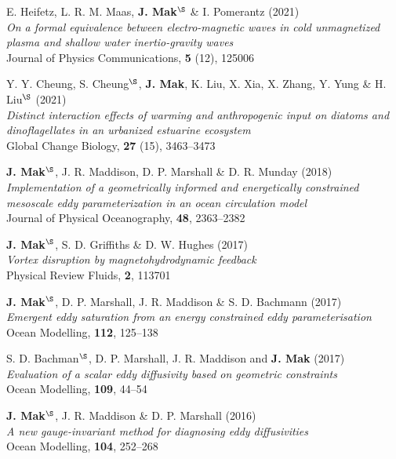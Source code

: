\documentclass[letterpaper]{article}
\renewenvironment{itemize}{
  \begin{list}{}{
    \setlength{\leftmargin}{1.5em}
  }
}{
  \end{list}
}
\begin{document}
\begin{itemize}
\item[11.] E. Heifetz, L. R. M. Maas, \textbf{J. Mak}$^{\S}$ \& I. Pomerantz (2021)\\
\textit{On a formal equivalence between electro-magnetic waves in cold unmagnetized plasma and shallow water inertio-gravity waves}\\
Journal of Physics Communications, \textbf{5} (12), 125006

\item[10.] Y. Y. Cheung, S. Cheung$^{\S}$, \textbf{J. Mak}, K. Liu, X. Xia, X. Zhang, Y. Yung \& H. Liu$^{\S}$ (2021)\\
\textit{Distinct interaction effects of warming and anthropogenic input on
diatoms and dinoflagellates in an urbanized estuarine ecosystem}\\
Global Change Biology, \textbf{27} (15), 3463--3473

\item[9.] \textbf{J. Mak}$^{\S}$, J. R. Maddison, D. P. Marshall \& D. R. Munday
(2018)\\
\textit{Implementation of a geometrically informed and energetically constrained
mesoscale eddy parameterization in an ocean circulation model}\\
Journal of Physical Oceanography, \textbf{48}, 2363--2382

\item[8.] \textbf{J. Mak}$^{\S}$, S. D. Griffiths \& D. W. Hughes
(2017)\\
\textit{Vortex disruption by magnetohydrodynamic feedback}\\
Physical Review Fluids, \textbf{2}, 113701

\item[7.] \textbf{J. Mak}$^{\S}$, D. P. Marshall, J. R. Maddison \& S. D. Bachmann
(2017)\\
\textit{Emergent eddy saturation from an energy constrained eddy parameterisation}\\
Ocean Modelling, \textbf{112}, 125--138

\item[6.] S. D. Bachman$^{\S}$, D. P. Marshall, J. R. Maddison and \textbf{J. Mak}
(2017)\\
\textit{Evaluation of a scalar eddy diffusivity based on geometric constraints}\\
Ocean Modelling, \textbf{109}, 44--54

\item[5.] \textbf{J. Mak}$^{\S}$, J. R. Maddison \& D. P. Marshall
(2016)\\
\textit{A new gauge-invariant method for diagnosing eddy diffusivities}\\
Ocean Modelling, \textbf{104}, 252--268


\end{itemize}
\end{document}
